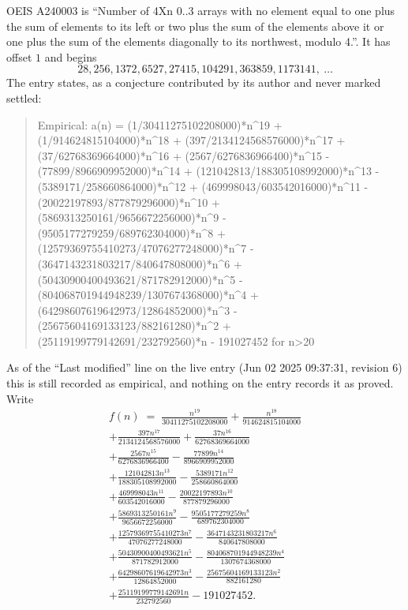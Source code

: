\documentclass[11pt,a4paper]{article}
\theoremstyle{plain}
\theoremstyle{definition}
\begin{document}
OEIS A240003 is ``Number of 4Xn 0..3 arrays with no element equal to one plus the sum of elements to its left or two plus the sum of the elements above it or one plus the sum of the elements diagonally to its northwest, modulo 4.''. It has offset $1$ and begins
\[
28, 256, 1372, 6527, 27415, 104291, 363859, 1173141,\ \dots
\]
The entry states, as a conjecture contributed by its author and never marked settled:
\begin{quote}\raggedright\small
Empirical: a(n) = (1/30411275102208000)*n\^{}19 + (1/914624815104000)*n\^{}18 + (397/2134124568576000)*n\^{}17 + (37/62768369664000)*n\^{}16 + (2567/6276836966400)*n\^{}15 - (77899/8966909952000)*n\^{}14 + (121042813/188305108992000)*n\^{}13 - (5389171/258660864000)*n\^{}12 + (469998043/603542016000)*n\^{}11 - (20022197893/877879296000)*n\^{}10 + (5869313250161/9656672256000)*n\^{}9 - (9505177279259/689762304000)*n\^{}8 + (12579369755410273/47076277248000)*n\^{}7 - (3647143231803217/840647808000)*n\^{}6 + (50430900400493621/871782912000)*n\^{}5 - (804068701944948239/1307674368000)*n\^{}4 + (64298607619642973/12864852000)*n\^{}3 - (25675604169133123/882161280)*n\^{}2 + (25119199779142691/232792560)*n - 191027452 for n>20
\end{quote}
As of the ``Last modified'' line on the live entry (Jun 02 2025 09:37:31, revision 6) this is still
recorded as empirical, and nothing on the entry records it as proved. Write
\begin{multline*}
f(n)\;=\;\frac{n^{19}}{30411275102208000} + \frac{n^{18}}{914624815104000} \\
+ \frac{397 n^{17}}{2134124568576000} + \frac{37 n^{16}}{62768369664000} \\
+ \frac{2567 n^{15}}{6276836966400} - \frac{77899 n^{14}}{8966909952000} \\
+ \frac{121042813 n^{13}}{188305108992000} - \frac{5389171 n^{12}}{258660864000} \\
+ \frac{469998043 n^{11}}{603542016000} - \frac{20022197893 n^{10}}{877879296000} \\
+ \frac{5869313250161 n^{9}}{9656672256000} - \frac{9505177279259 n^{8}}{689762304000} \\
+ \frac{12579369755410273 n^{7}}{47076277248000} - \frac{3647143231803217 n^{6}}{840647808000} \\
+ \frac{50430900400493621 n^{5}}{871782912000} - \frac{804068701944948239 n^{4}}{1307674368000} \\
+ \frac{64298607619642973 n^{3}}{12864852000} - \frac{25675604169133123 n^{2}}{882161280} \\
+ \frac{25119199779142691 n}{232792560} - 191027452.
\end{multline*}
\end{document}

